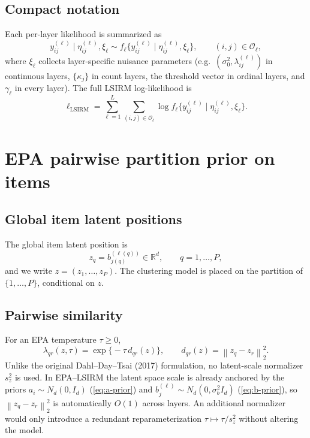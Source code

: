 \documentclass[11pt]{article}
\newcommand{\R}{\mathbb R}
\newcommand{\norm}[1]{\left\lVert #1 \right\rVert}
\begin{document}
\subsection{Compact notation}

Each per-layer likelihood is summarized as
\begin{equation}
    y_{ij}^{(\ell)}\mid \eta_{ij}^{(\ell)},\xi_\ell
    \sim f_\ell\bigl\{y_{ij}^{(\ell)}\mid \eta_{ij}^{(\ell)},\xi_\ell\bigr\},
    \qquad (i,j)\in\mathcal O_\ell,
\end{equation}
where $\xi_\ell$ collects layer-specific nuisance parameters (e.g.\
$(\sigma_0^2,\lambda_{ij}^{(\ell)})$ in continuous layers,
$\{\kappa_j\}$ in count layers, the threshold vector in ordinal layers, and
$\gamma_\ell$ in every layer).  The full LSIRM log-likelihood is
\begin{equation}
    \ell_{\mathrm{LSIRM}}
    =
    \sum_{\ell=1}^L\sum_{(i,j)\in\mathcal O_\ell}
    \log f_\ell\bigl\{y_{ij}^{(\ell)}\mid \eta_{ij}^{(\ell)},\xi_\ell\bigr\}.
    \label{eq:lsirm-loglik}
\end{equation}

\section{EPA pairwise partition prior on items}
\label{sec:epa-prior}

\subsection{Global item latent positions}

The global item latent position is
\begin{equation}
    z_q = b_{j(q)}^{(\ell(q))}\in\R^d,
    \qquad q=1,\dots,P,
\end{equation}
and we write $z=(z_1,\dots,z_P)$.  The clustering model is placed on the
partition of $\{1,\dots,P\}$, conditional on $z$.

\subsection{Pairwise similarity}

For an EPA temperature $\tau\geq 0$,
\begin{equation}
    \lambda_{qr}(z,\tau) = \exp\!\bigl\{-\tau\,d_{qr}(z)\bigr\},
    \qquad d_{qr}(z)=\norm{z_q-z_r}_2^2.
    \label{eq:lambda}
\end{equation}
Unlike the original Dahl--Day--Tsai (2017) formulation, no latent-scale
normalizer $s_z^2$ is used.  In EPA--LSIRM the latent space scale is already
anchored by the priors $a_i\sim N_d(0,I_d)$ (\ref{eq:a-prior}) and
$b_j^{(\ell)}\sim N_d(0,\sigma_b^2 I_d)$ (\ref{eq:b-prior}), so $\norm{z_q-z_r}_2^2$
is automatically $O(1)$ across layers.  An additional normalizer would only
introduce a redundant reparameterization
$\tau\mapsto\tau/s_z^2$ without altering the model.
\end{document}
